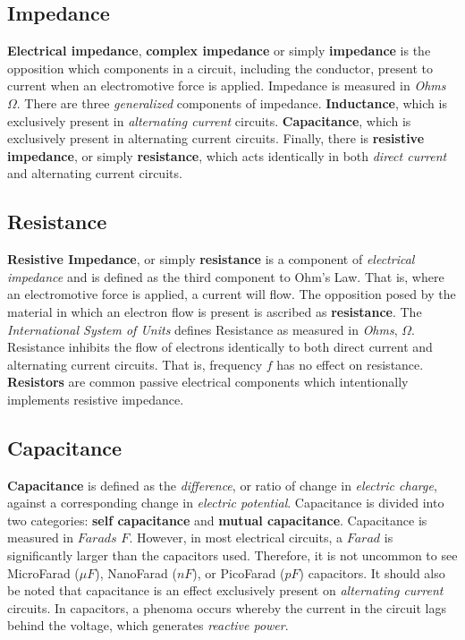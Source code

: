 \documentclass[11pt,a4paper]{article}
\begin{document}
\subsection*{Impedance}
\textbf{Electrical impedance}, \textbf{complex impedance} or simply \textbf{impedance} is the opposition which components in a circuit, including the conductor, present to current when an electromotive force is applied.\cite{e6} Impedance is measured in \textit{Ohms} $\Omega$. There are three \textit{generalized} components of impedance. \textbf{Inductance}, which is exclusively present in \textit{alternating current} circuits. \textbf{Capacitance}, which is exclusively present in alternating current circuits. Finally, there is \textbf{resistive impedance}, or simply \textbf{resistance}, which acts identically in both \textit{direct current} and alternating current circuits.
\subsection*{Resistance}
\textbf{Resistive Impedance}, or simply \textbf{resistance} is a component of \textit{electrical impedance} and is defined as the third component to Ohm's Law. That is, where an electromotive force is applied, a current will flow. The opposition posed by the material in which an electron flow is present is ascribed as \textbf{resistance}. The \textit{International System of Units} defines Resistance as measured in \textit{Ohms}, $\Omega$. Resistance inhibits the flow of electrons identically to both direct current and alternating current circuits. That is, frequency $f$ has no effect on resistance. \textbf{Resistors} are common passive electrical components which intentionally implements resistive impedance.
\subsection*{Capacitance}
\textbf{Capacitance} is defined as the \textit{difference}, or ratio of change in \textit{electric charge}, against a corresponding change in \textit{electric potential}. Capacitance is divided into two categories: \textbf{self capacitance} and \textbf{mutual capacitance}. Capacitance is measured in $Farads$ $F$. However, in most electrical circuits, a $Farad$ is significantly larger than the capacitors used. Therefore, it is not uncommon to see MicroFarad ($\mu F$), NanoFarad ($nF$), or PicoFarad ($pF$) capacitors. It should also be noted that capacitance is an effect exclusively present on \textit{alternating current} circuits. In capacitors, a phenoma occurs whereby the current in the circuit lags behind the voltage, which generates \textit{reactive power}.
\end{document}
